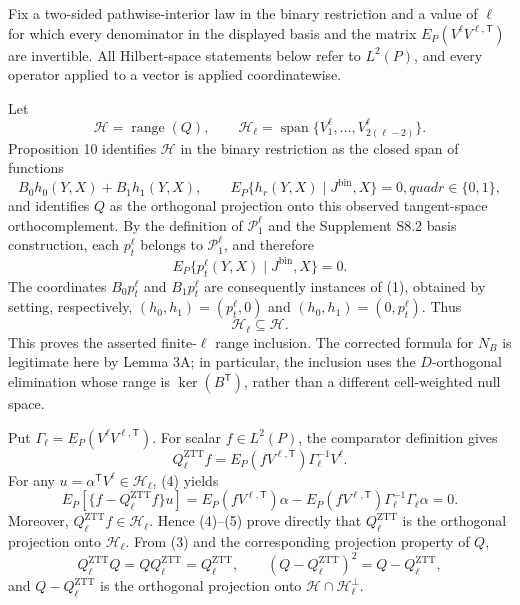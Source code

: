 Fix a two-sided pathwise-interior law in the binary restriction and a value of \(\ell\) for which every denominator in the displayed basis and the matrix \(E_P(V^\ell V^{\ell,\mathsf T})\) are invertible.  All Hilbert-space statements below refer to \(L^2(P)\), and every operator applied to a vector is applied coordinatewise.

Let
\[
\mathcal H=\operatorname{range}(Q),
\qquad
\mathcal H_\ell=\operatorname{span}\{V_1^\ell,\ldots,V_{2(\ell-2)}^\ell\}.
\]
Proposition 10 identifies \(\mathcal H\) in the binary restriction as the closed span of functions
\[
B_0h_0(Y,X)+B_1h_1(Y,X),
\qquad
E_P\{h_r(Y,X)\mid J^{\mathrm{bin}},X\}=0,quad r\in\{0,1\},                                      \tag{1}
\]
and identifies \(Q\) as the orthogonal projection onto this observed tangent-space orthocomplement.  By the definition of \(\mathcal P_1^\ell\) and the Supplement S8.2 basis construction, each \(p_t^\ell\) belongs to \(\mathcal P_1^\ell\), and therefore
\[
E_P\{p_t^\ell(Y,X)\mid J^{\mathrm{bin}},X\}=0.                                            \tag{2}
\]
The coordinates \(B_0p_t^\ell\) and \(B_1p_t^\ell\) are consequently instances of (1), obtained by setting, respectively, \((h_0,h_1)=(p_t^\ell,0)\) and \((h_0,h_1)=(0,p_t^\ell)\).  Thus
\[
\mathcal H_\ell\subseteq\mathcal H.                                                       \tag{3}
\]
This proves the asserted finite-\(\ell\) range inclusion.  The corrected formula for \(N_B\) is legitimate here by Lemma 3A; in particular, the inclusion uses the \(D\)-orthogonal elimination whose range is \(\ker(B^{\mathsf T})\), rather than a different cell-weighted null space.

Put \(\Gamma_\ell=E_P(V^\ell V^{\ell,\mathsf T})\).  For scalar \(f\in L^2(P)\), the comparator definition gives
\[
Q_\ell^{\mathrm{ZTT}}f
=E_P(fV^{\ell,\mathsf T})\Gamma_\ell^{-1}V^\ell.                                           \tag{4}
\]
For any \(u=\alpha^{\mathsf T}V^\ell\in\mathcal H_\ell\), (4) yields
\[
E_P\!\left[\{f-Q_\ell^{\mathrm{ZTT}}f\}u\right]
=E_P(fV^{\ell,\mathsf T})\alpha
-E_P(fV^{\ell,\mathsf T})\Gamma_\ell^{-1}\Gamma_\ell\alpha
=0.                                                                                        \tag{5}
\]
Moreover, \(Q_\ell^{\mathrm{ZTT}}f\in\mathcal H_\ell\).  Hence (4)--(5) prove directly that \(Q_\ell^{\mathrm{ZTT}}\) is the orthogonal projection onto \(\mathcal H_\ell\).  From (3) and the corresponding projection property of \(Q\),
\[
Q_\ell^{\mathrm{ZTT}}Q=QQ_\ell^{\mathrm{ZTT}}=Q_\ell^{\mathrm{ZTT}},
\qquad
(Q-Q_\ell^{\mathrm{ZTT}})^2=Q-Q_\ell^{\mathrm{ZTT}},                                      \tag{6}
\]
and \(Q-Q_\ell^{\mathrm{ZTT}}\) is the orthogonal projection onto \(\mathcal H\cap\mathcal H_\ell^\perp\).

